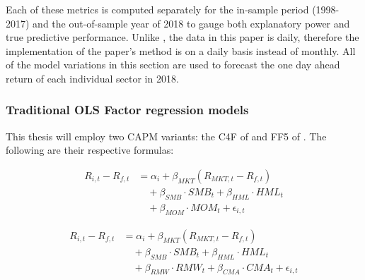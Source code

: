 
Each of these metrics is computed separately for the in-sample period (1998-2017) and the out-of-sample year of 2018 to gauge both explanatory power and true predictive performance. Unlike , the data in this paper is daily, therefore the implementation of the paper's method is on a daily basis instead of monthly. All of the model variations in this section are used to forecast the one day ahead return of each individual sector in 2018. 

\subsubsection{Traditional OLS Factor regression models}
This thesis will employ two CAPM variants: the C4F of  and FF5 of . The following are their respective formulas:

\begin{equation}
    \label{eq:c4f}
    \begin{split}
        R_{i,t} - R_{f,t} &= \alpha_i + \beta_{MKT} (R_{MKT,t} - R_{f,t}) \\
        &\quad + \beta_{SMB} \cdot SMB_t + \beta_{HML} \cdot HML_t \\
        &\quad + \beta_{MOM} \cdot MOM_t + \epsilon_{i,t}
    \end{split}
\end{equation}

\begin{equation}
    \label{eq:ff5}
    \begin{split}
        R_{i,t} - R_{f,t} &= \alpha_i + \beta_{MKT} (R_{MKT,t} - R_{f,t}) \\
        &\quad + \beta_{SMB} \cdot SMB_t + \beta_{HML} \cdot HML_t \\
        &\quad + \beta_{RMW} \cdot RMW_t + \beta_{CMA} \cdot CMA_t + \epsilon_{i,t}
    \end{split}
\end{equation}

